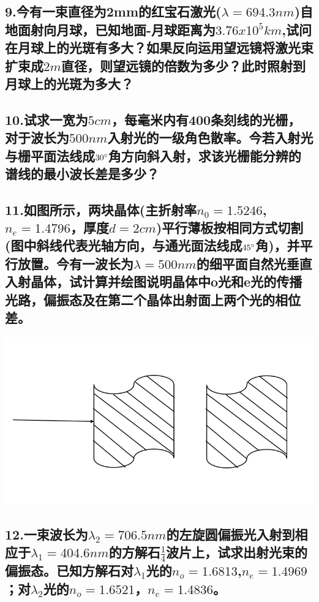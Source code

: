 \documentclass[11pt,a4paper]{article}
\begin{document}
    \subsection*{9.今有一束直径为2mm的红宝石激光($\lambda=694.3nm$)自地面射向月球，已知地面-月球距离为$3.76x10^{5}km$,试问在月球上的光斑有多大？如果反向运用望远镜将激光束扩束成$2m$直径，则望远镜的倍数为多少？此时照射到月球上的光斑为多大？}
    \vspace{10mm}
    \subsection*{10.试求一宽为$5cm$，每毫米内有400条刻线的光栅，对于波长为$500nm$入射光的一级角色散率。今若入射光与栅平面法线成$30\degree$角方向斜入射，求该光栅能分辨的谱线的最小波长差是多少？}
    \vspace{10mm}
    \subsection*{11.如图所示，两块晶体(主折射率$n_0=1.5246$,$n_e=1.4796$，厚度$d=2cm$)平行薄板按相同方式切割(图中斜线代表光轴方向，与通光面法线成$45\degree$角)，并平行放置。今有一波长为$\lambda=500nm$的细平面自然光垂直入射晶体，试计算并绘图说明晶体中o光和e光的传播光路，偏振态及在第二个晶体出射面上两个光的相位差。}
    \includegraphics[scale=0.2]{3.png}%
    \vspace{10mm}
    \subsection*{12.一束波长为$\lambda_{2}=706.5nm$的左旋圆偏振光入射到相应于$\lambda_1=404.6nm$的方解石$\frac{1}{4}$波片上，试求出射光束的偏振态。已知方解石对$\lambda_1$光的$n_o=1.6813$,$n_e=1.4969$；对$\lambda_2$光的$n_o=1.6521$，$n_e=1.4836$。}
    \vspace{10mm}
\end{document}
